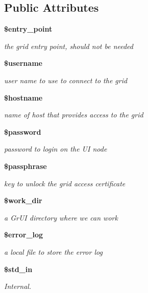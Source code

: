 \subsection*{Public Attributes}
\begin{CompactItemize}
\item 
{\bf \$entry\_\-point}
\begin{CompactList}\small\item\em the grid entry point, should not be needed \item\end{CompactList}\item 
{\bf \$username}
\begin{CompactList}\small\item\em user name to use to connect to the grid \item\end{CompactList}\item 
{\bf \$hostname}
\begin{CompactList}\small\item\em name of host that provides access to the grid \item\end{CompactList}\item 
{\bf \$password}
\begin{CompactList}\small\item\em password to login on the UI node \item\end{CompactList}\item 
{\bf \$passphrase}
\begin{CompactList}\small\item\em key to unlock the grid access certificate \item\end{CompactList}\item 
{\bf \$work\_\-dir}
\begin{CompactList}\small\item\em a Gr\-UI directory where we can work \item\end{CompactList}\item 
{\bf \$error\_\-log}
\begin{CompactList}\small\item\em a local file to store the error log \item\end{CompactList}\item 
{\bf \$std\_\-in}
\begin{CompactList}\small\item\em Internal. \item\end{CompactList}\item 

\end{CompactItemize}
